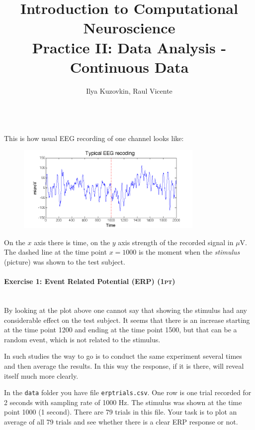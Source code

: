 \documentclass[a4paper,11pt]{article}
\author{\large{Ilya Kuzovkin, Raul Vicente}}
\title{\huge{Introduction to Computational Neuroscience}\\\LARGE{Practice II: Data Analysis - Continuous Data}}
\newenvironment{exercise}[3]{\paragraph{Exercise #1: #2 \textsc{(#3pt)}}\ \\}{
\medskip}
\begin{document}
\maketitle
\ \\
This is how usual EEG recording of one channel looks like:
\begin{figure}[H]
   \centering
   \includegraphics[width=0.8\textwidth]{eegrecording.png} 
\end{figure}
On the $x$ axis there is time, on the $y$ axis strength of the recorded signal in $\mu$V. The dashed line at the time point $x=1000$ is the moment when the \emph{stimulus} (picture) was shown to the test subject.

%
%
\begin{exercise}{1}{Event Related Potential (ERP)}{1}
By looking at the plot above one cannot say that showing the stimulus had any considerable effect on the test subject. It seems that there is an increase starting at the time point 1200 and ending at the time point 1500, but that can be a random event, which is not related to the stimulus.

In such studies the way to go is to conduct the same experiment several times and then average the results. In this way the response, if it is there, will reveal itself much more clearly.

In the \texttt{data} folder you have file \texttt{erptrials.csv}. One row is one trial recorded for 2 seconds with sampling rate of 1000 Hz. The stimulus was shown at the time point 1000 (1 second). There are 79 trials in this file. Your task is to plot an average of all 79 trials and see whether there is a clear ERP response or not.
\end{exercise}
\end{document}
